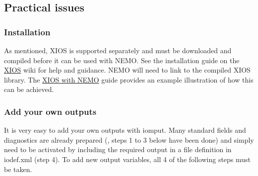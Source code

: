 \documentclass[../main/NEMO_manual]{subfiles}
\begin{document}
\subsection{Practical issues}

\subsubsection{Installation}

As mentioned, XIOS is supported separately and must be downloaded and compiled before it can be used with NEMO.
See the installation guide on the \href{http://forge.ipsl.jussieu.fr/ioserver/wiki}{XIOS} wiki for help and guidance.
NEMO will need to link to the compiled XIOS library.
The \href{https://forge.ipsl.jussieu.fr/nemo/wiki/Users/ModelInterfacing/InputsOutputs#Inputs-OutputsusingXIOS}
{XIOS with NEMO} guide provides an example illustration of how this can be achieved.

\subsubsection{Add your own outputs}

It is very easy to add your own outputs with iomput.
Many standard fields and diagnostics are already prepared (\ie, steps 1 to 3 below have been done) and
simply need to be activated by including the required output in a file definition in iodef.xml (step 4).
To add new output variables, all 4 of the following steps must be taken.
\end{document}
